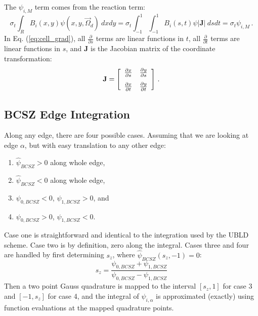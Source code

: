 \documentclass{mc2015}
\newcommand{\benum}{\begin{equation}} 			%
\newcommand{\eenum}{\end{equation}}
\newcommand{\eqt}[1]{Eq. (\ref{#1})}  %
\newcommand{\B}[1]{\ensuremath{{B_{#1} }}}
\newcommand{\p}{\ensuremath{ \partial}}
\newcommand{\abs}[1]{\ensuremath{\left\lvert #1 \right\rvert}}
\newcommand{\BCSZH}{\ensuremath{\widehat{\psi}_{BCSZ}}}
\newcommand{\omg}{\ensuremath{\vec{\Omega}}}
\newcommand{\pep}{\, .}
\begin{document}
The $\psi_{i,M}$ term comes from the reaction term:
\benum
\sigma_t\int_R{ \B{i}(x,y) \psi(x,y,\omg_d)~dxdy} = \sigma_t\int_{-1}^1{\int_{-1}^1{ \B{i}(s,t) \psi \abs{\mathbf J}~dsdt}} = \sigma_t \psi_{i,M} \pep
\eenum
In \eqt{eq:cell_grad},  all $\frac{\p}{\p s}$ terms are linear functions in $t$, all $\frac{\p}{\p t}$ terms are linear functions in $s$, and $\mathbf{J}$ is the Jacobian matrix of the coordinate transformation:
\benum
\mathbf{J} = \left[ \begin{array}{cc} 
\frac{\p x}{\p s} & \frac{\p y}{\p s} \vspace{0.1in}\\
\frac{\p x}{\p t} & \frac{\p y}{\p t}
\end{array}\right] \pep
\eenum

\subsection{BCSZ Edge Integration}
Along any edge, there are four possible cases.  Assuming that we are looking at edge $\alpha$, but with easy translation to any other edge:
\begin{enumerate}
\item $\BCSZH > 0$ along whole edge,
\item  $\BCSZH < 0$ along whole edge,
\item $\psi_{0,BCSZ} < 0$, $\psi_{1,BCSZ} > 0$, and
\item $\psi_{0,BCSZ} > 0$, $\psi_{1,BCSZ} <0$.
\end{enumerate}
Case one is straightforward and identical to the integration used by the UBLD scheme. 
Case two is by definition, zero along the integral.
Cases three and four are handled by first determining $s_z$, where $\BCSZH(s_z,-1) = 0$:
\benum
s_z = \frac{\psi_{0,BCSZ}+\psi_{1,BCSZ}}{\psi_{0,BCSZ} - \psi_{1,BCSZ} }
\eenum
Then a two point Gauss quadrature is mapped to the interval $[s_z,1]$ for case 3 and $[-1,s_z]$ for case 4, and the integral of $\psi_{i,\alpha}$
is approximated (exactly) using function evaluations at the mapped quadrature points.
\end{document}
